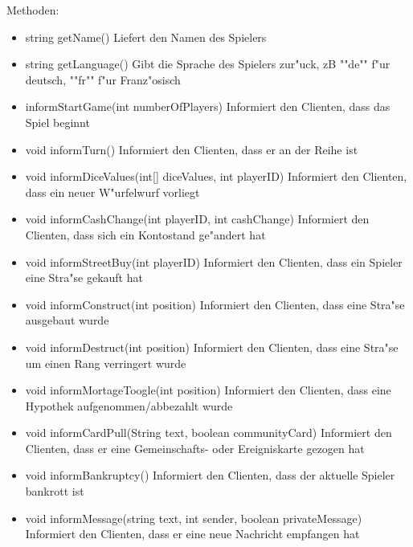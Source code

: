 \documentclass[a4paper,10pt]{article}
\begin{document}
\begin{itemize}
Methoden:
\begin{itemize}
\item string getName()
Liefert den Namen des Spielers
\item string getLanguage()
Gibt die Sprache des Spielers zur"uck, zB ""de"" f"ur deutsch, ""fr"" f"ur Franz"osisch
\item informStartGame(int numberOfPlayers)
Informiert den Clienten, dass das Spiel beginnt
\item void informTurn()
Informiert den Clienten, dass er an der Reihe ist
\item void informDiceValues(int[] diceValues, int playerID)
Informiert den Clienten, dass ein neuer W"urfelwurf vorliegt
\item void informCashChange(int playerID, int cashChange)
Informiert den Clienten, dass sich ein Kontostand ge"andert hat
\item void informStreetBuy(int playerID)
Informiert den Clienten, dass ein Spieler eine Stra"se gekauft hat
\item void informConstruct(int position)
Informiert den Clienten, dass eine Stra"se ausgebaut wurde
\item void informDestruct(int position)
Informiert den Clienten, dass eine Stra"se um einen Rang verringert wurde
\item void informMortageToogle(int position)
Informiert den Clienten, dass eine Hypothek aufgenommen/abbezahlt wurde
\item void informCardPull(String text, boolean communityCard)
Informiert den Clienten, dass er eine Gemeinschafts- oder Ereigniskarte gezogen hat
\item void informBankruptcy()
Informiert den Clienten, dass der aktuelle Spieler bankrott ist
\item void informMessage(string text, int sender, boolean privateMessage)
Informiert den Clienten, dass er eine neue Nachricht empfangen hat
\end{itemize}
\end{itemize} %
\end{document}
